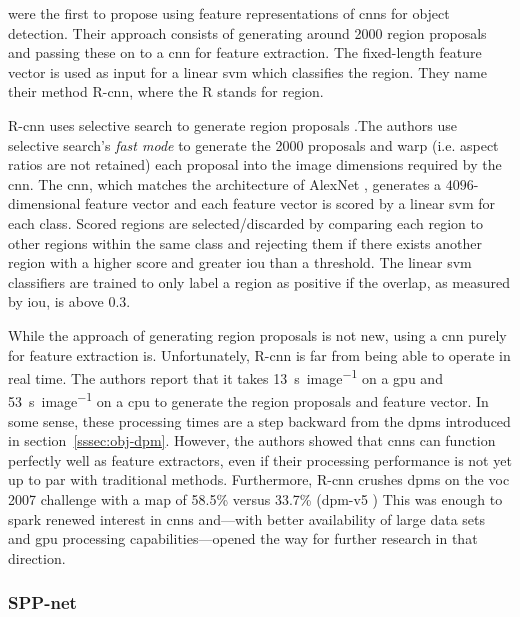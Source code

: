 \documentclass[draft,final]{vutinfth} %
\begin{document}
\textcite{girshick2014} were the first to propose using feature
representations of \glspl{cnn} for object detection. Their approach
consists of generating around 2000 region proposals and passing these
on to a \gls{cnn} for feature extraction. The fixed-length feature
vector is used as input for a linear \gls{svm} which classifies the
region. They name their method R-\gls{cnn}, where the R stands for
region.

R-\gls{cnn} uses selective search to generate region proposals
\cite{uijlings2013}.The authors use selective search's \emph{fast
mode} to generate the 2000 proposals and warp (i.e. aspect ratios are
not retained) each proposal into the image dimensions required by the
\gls{cnn}. The \gls{cnn}, which matches the architecture of AlexNet
\cite{krizhevsky2012}, generates a $4096$-dimensional feature vector
and each feature vector is scored by a linear \gls{svm} for each
class. Scored regions are selected/discarded by comparing each region
to other regions within the same class and rejecting them if there
exists another region with a higher score and greater \gls{iou} than a
threshold. The linear \gls{svm} classifiers are trained to only label
a region as positive if the overlap, as measured by \gls{iou}, is
above $0.3$.

While the approach of generating region proposals is not new, using a
\gls{cnn} purely for feature extraction is. Unfortunately, R-\gls{cnn}
is far from being able to operate in real time. The authors report
that it takes \qty{13}{\s\per image} on a \gls{gpu} and
\qty{53}{\s\per image} on a \gls{cpu} to generate the region proposals
and feature vector. In some sense, these processing times are a step
backward from the \glspl{dpm} introduced in
section~\ref{sssec:obj-dpm}. However, the authors showed that
\glspl{cnn} can function perfectly well as feature extractors, even if
their processing performance is not yet up to par with traditional
methods. Furthermore, R-\gls{cnn} crushes \glspl{dpm} on the \gls{voc}
2007 challenge with a \gls{map} of 58.5\% \cite{girshick2014} versus
33.7\% (\gls{dpm}-v5 \cite{girshick,felzenszwalb2010}) This was enough
to spark renewed interest in \glspl{cnn} and—with better availability
of large data sets and \gls{gpu} processing capabilities—opened the
way for further research in that direction.

\subsubsection{SPP-net}
\label{sssec:theory-spp-net}
\end{document}
